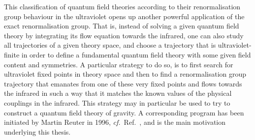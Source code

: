 \documentclass[11pt]{book}
\newcommand\cf{\textit{cf.}\ }
\numberwithin{equation}{chapter}
\begin{document}
This classification of quantum field theories according
to their renormalisation group behaviour in the ultraviolet
opens up another powerful application of the exact
renormalisation group. That is, instead of solving a given
quantum field theory by integrating its flow equation
towards the infrared, one can also study all trajectories
of a given theory space, and choose a trajectory that is
ultraviolet-finite in order to define a fundamental
quantum field theory with some given field content and
symmetries. A particular strategy to do so,
is to first search for ultraviolet fixed points in theory space
and then to find a renormalisation group trajectory that
emanates from one of these very fixed points and flows
towards the infrared in such a way that it matches
the known values of the physical couplings in the infrared.
This strategy may in particular be used to try to construct
a quantum field theory of gravity.
A corresponding program has been initiated
by Martin Reuter in 1996, \cf Ref.~\cite{Reuter:1996cp},
and is the main motivation underlying this thesis.
\end{document}
